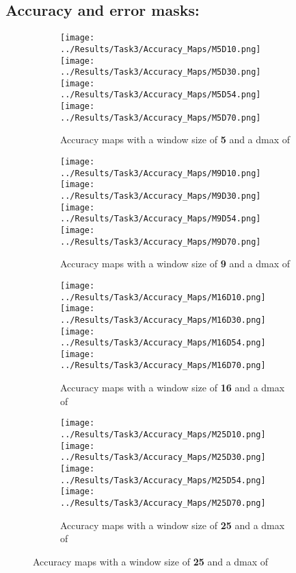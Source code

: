 \documentclass{article}
\begin{document}
\subsection{Accuracy and error masks:}
\begin{figure}[H]
    \centering
    \begin{subfigure}{\linewidth}
        \centering
        \texttt{[image: ../Results/Task3/Accuracy\_Maps/M5D10.png]}
        \texttt{[image: ../Results/Task3/Accuracy\_Maps/M5D30.png]}
        \texttt{[image: ../Results/Task3/Accuracy\_Maps/M5D54.png]}
        \texttt{[image: ../Results/Task3/Accuracy\_Maps/M5D70.png]}
        \caption{Accuracy maps with a window size of \textbf{5} and a dmax of }
    \end{subfigure}
    \begin{subfigure}{\linewidth}
        \centering
        \texttt{[image: ../Results/Task3/Accuracy\_Maps/M9D10.png]}
        \texttt{[image: ../Results/Task3/Accuracy\_Maps/M9D30.png]}
        \texttt{[image: ../Results/Task3/Accuracy\_Maps/M9D54.png]}
        \texttt{[image: ../Results/Task3/Accuracy\_Maps/M9D70.png]}
        \caption{Accuracy maps with a window size of \textbf{9} and a dmax of }
    \end{subfigure}
    \begin{subfigure}{\linewidth}
        \centering
        \texttt{[image: ../Results/Task3/Accuracy\_Maps/M16D10.png]}
        \texttt{[image: ../Results/Task3/Accuracy\_Maps/M16D30.png]}
        \texttt{[image: ../Results/Task3/Accuracy\_Maps/M16D54.png]}
        \texttt{[image: ../Results/Task3/Accuracy\_Maps/M16D70.png]}
        \caption{Accuracy maps with a window size of \textbf{16} and a dmax of }
    \end{subfigure}
    \begin{subfigure}{\linewidth}
        \centering
        \texttt{[image: ../Results/Task3/Accuracy\_Maps/M25D10.png]}
        \texttt{[image: ../Results/Task3/Accuracy\_Maps/M25D30.png]}
        \texttt{[image: ../Results/Task3/Accuracy\_Maps/M25D54.png]}
        \texttt{[image: ../Results/Task3/Accuracy\_Maps/M25D70.png]}
        \caption{Accuracy maps with a window size of \textbf{25} and a dmax of }
    \end{subfigure}
\end{figure}
\end{document}
